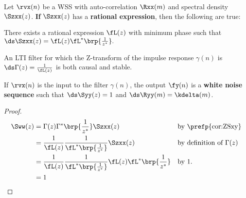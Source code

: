 \begin{theorem}
\label{thm:d-innovations}
Let $\rvx(n)$ be a WSS  with auto-correlation $\Rxx(m)$
and spectral density $\Szxx(z)$.
\textbf{If} $\Szxx(z)$ has a \textbf{rational expression},
then the following are true:

\begin{enume}
   \item There exists a rational expression $\fL(z)$ with minimum phase such that
         \\$\ds \Szxx(z) =\fL(z)\fL^\ast\brp{\frac{1}{z^\ast}}.$
   \item An LTI filter for which the Z-transform of the impulse response $\gamma(n)$ is
         $\ds \Gamma(z) = \frac{1}{\fL(z)}$
         is both causal and stable.
   \item If $\rvx(n)$ is the input to the filter $\gamma(n)$, the output $\fy(n)$ is a \textbf{white noise sequence} such that
         $\ds\Syy(z) = 1$ and $\ds\Ryy(m)=\kdelta(m)$.
\end{enume}
\end{theorem}


\begin{proof}
\begin{align*}
   \Sww(z)
     &= \Gamma(z)\Gamma^\ast\brp{\frac{1}{z^\ast}} \Szxx(z)
     && \text{by \prefp{cor:ZSxy}}
   \\&= \frac{1}{\fL(z)} \frac{1}{\fL^\ast\brp{\frac{1}{z^\ast}}} \Szxx(z)
     && \text{by definition of $\Gamma(z)$}
   \\&= \frac{1}{\fL(z)} \frac{1}{\fL^\ast\brp{\frac{1}{z^\ast}}}
        \fL(z)\fL^\ast\brp{\frac{1}{z^\ast}}
     && \text{by 1.}
   \\&= 1
\end{align*}
\end{proof}

